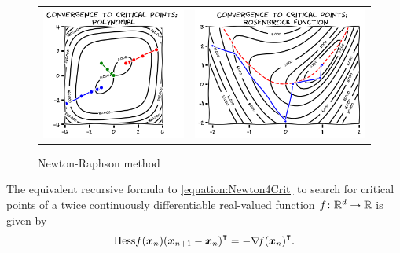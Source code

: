 \begin{figure}[ht!]
\begin{tabular}{cc}
\includegraphics[width=0.45\linewidth]{images/convergenceNewton.png} &
\includegraphics[width=0.55\linewidth]{images/convergenceNewtonRosenbrock.png} 
\end{tabular}
\caption{Newton-Raphson method}
\label{figure:NewtonConvergence}
\end{figure}

\begin{remark}
The equivalent recursive formula to \eqref{equation:Newton4Crit} to search for critical points of a twice continuously differentiable real-valued function $f \colon \mathbb{R}^d \to \mathbb{R}$ is given by
\begin{equation}\index{Newton-Raphson method}\index{Newton-Raphson method!recursive formula}\index{Newton-Raphson method!iteration}
\Hess{f}(\x_n) \transpose{(\x_{n+1}-\x_n)} = -\transpose{\gradient{f}(\x_n)}.
\end{equation}
\end{remark}

